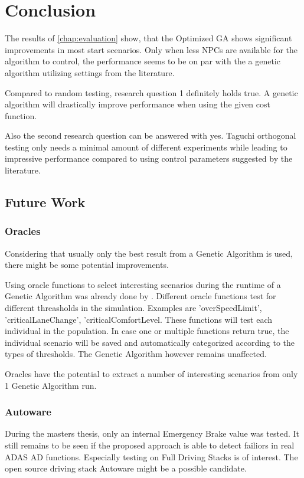 \chapter{Conclusion}

The results of \ref{chap:evaluation} show, that the Optimized GA shows significant improvements in most start scenarios. Only when less NPCs are available for the algorithm to control, the performance seems to be on par with the a genetic algorithm utilizing settings from the literature.

Compared to random testing, research question 1 definitely holds true. A genetic algorithm will drastically improve performance when using the given cost function.

Also the second research question can be answered with yes. Taguchi orthogonal testing only needs a minimal amount of different experiments while leading to impressive performance compared to using control parameters suggested by the literature.



\section{Future Work}
\subsection{Oracles}
Considering that usually only the best result from a Genetic Algorithm is used, there might be some potential improvements.

Using oracle functions to select interesting scenarios during the runtime of a Genetic Algorithm was already done by \cite{almanee_scenorita_2021}. Different oracle functions test for different threasholds in the simulation. Examples are 'overSpeedLimit', 'criticalLaneChange', 'criticalComfortLevel. These functions will test each individual in the population. In case one or multiple functions return true, the individual scenario will be saved and automatically categorized according to the types of thresholds. The Genetic Algorithm however remains unaffected.

Oracles have the potential to extract a number of interesting scenarios from only 1 Genetic Algorithm run.

\subsection{Autoware}
During the masters thesis, only an internal Emergency Brake value was tested. It still remains to be seen if the proposed approach is able to detect failiors in real ADAS AD functions. Especially testing on Full Driving Stacks is of interest. The open source driving stack Autoware might be a possible candidate.